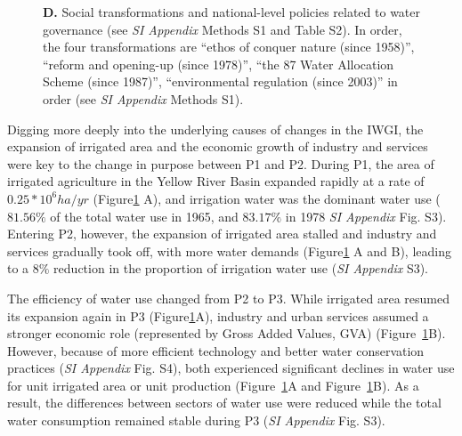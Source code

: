 \documentclass[9pt, twocolumn, twoside, lineno]{pnas-new}
\begin{document}
\begin{figure}[th!]
{		\textbf{D.} Social transformations and national-level policies related to water governance (see \textit{SI Appendix} Methods S1 and Table S2). In order, the four transformations are ``ethos of conquer nature (since 1958)'', ``reform and opening-up (since 1978)'', ``the 87 Water Allocation Scheme (since 1987)'', ``environmental regulation (since 2003)'' in order (see \textit{SI Appendix} Methods S1).
	}
	\label{fig:Causes}
\end{figure}

Digging more deeply into the underlying causes of changes in the IWGI, the expansion of irrigated area and the economic growth of industry and services were key to the change in purpose between P1 and P2. 
During P1, the area of irrigated agriculture in the Yellow River Basin expanded rapidly at a rate of $0.25*10^6 ha/yr$ (Figure\ref{fig:Causes} A), and irrigation water was the dominant water use ($81.56\%$ of the total water use in 1965, and $83.17\%$ in 1978 \textit{SI Appendix} Fig. S3). 
Entering P2, however, the expansion of irrigated area stalled and industry and services gradually took off, with more water demands (Figure\ref{fig:Causes} A and B), leading to a $8\%$ reduction in the proportion of irrigation water use (\textit{SI Appendix} S3).

The efficiency of water use changed from P2 to P3. 
While irrigated area resumed its expansion again in P3 (Figure\ref{fig:Causes}A), industry and urban services assumed a stronger economic role (represented by Gross Added Values, GVA) (Figure~\ref{fig:Causes}B). 
However, because of more efficient technology and better water conservation practices (\textit{SI Appendix} Fig. S4), both experienced significant declines in water use for unit irrigated area or unit production (Figure~\ref{fig:Causes}A and Figure~\ref{fig:Causes}B). 
As a result, the differences between sectors of water use were reduced while the total water consumption remained stable during P3 (\textit{SI Appendix} Fig. S3).
\end{document}

